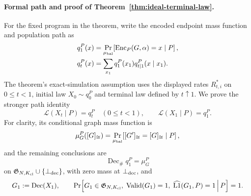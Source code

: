 \documentclass{article}
\begin{document}
\paragraph{Formal path and proof of Theorem~\ref{thm:ideal-terminal-law}.}
For the fixed program in the theorem, write the encoded endpoint mass function and population path
as
\begin{align}
 q_1^P(x)
 &=\Pr_{\mu_{\rm bal}}\!\left[
 \operatorname{Enc}_P(G,\alpha)=x\mid P\right],\\
 q_t^P(x)
 &=\sum_{x_1}q_1^P(x_1)q_{t\mid1}^P(x\mid x_1).
\end{align}
The theorem's exact-simulation assumption uses the displayed rates $R^*_{t,i}$ on $0\leq t<1$,
initial law $X_0\sim q_0^P$ and terminal law defined by $t\uparrow1$. We prove the stronger path
identity
\begin{equation}
 \mathcal L(X_t\mid P)=q_t^P\quad(0\leq t<1),
 \qquad
 \mathcal L(X_1\mid P)=q_1^P.
\end{equation}
For clarity, its conditional graph mass function is
\begin{equation}
 \mu_G^P([G]_{\cong})
 =\Pr_{\mu_{\rm bal}}\!\left[[G']_{\cong}=[G]_{\cong}\mid P\right],
\end{equation}
and the remaining conclusions are
\begin{equation}
 \operatorname{Dec}_{\#}q_1^P=\mu_G^P
\end{equation}
on $\mathfrak G_{N,K_{\rm cl}}\cup\{\bot_{\rm dec}\}$, with zero mass at
$\bot_{\rm dec}$, and
\begin{equation}
 G_1:=\operatorname{Dec}(X_1),\qquad
 \Pr\!\left[
 G_1\in\mathfrak G_{N,K_{\rm cl}},\;
 \mathrm{Valid}(G_1)=1,\;
 \widehat{\mathrm{L1}}(G_1,P)=1
 \,\middle|\,P\right]=1.
\end{equation}
\end{document}
